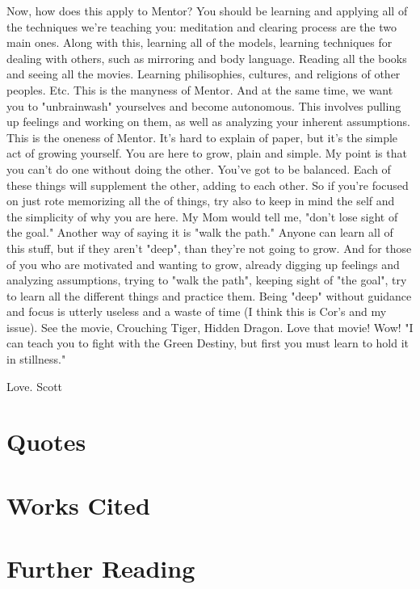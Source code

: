 Now, how does this apply to Mentor? You should be learning and applying all of the techniques we're teaching you: meditation and clearing process are the two main ones. Along with this, learning all of the models, learning techniques for dealing with others, such as mirroring and body language. Reading all the books and seeing all the movies. Learning philisophies, cultures, and religions of other peoples. Etc.
This is the manyness of Mentor.
And at the same time, we want you to "unbrainwash" yourselves and become autonomous. This involves pulling up feelings and working on them, as well as analyzing your inherent assumptions.
This is the oneness of Mentor. It's hard to explain of paper, but it's the simple act of growing yourself. You are here to grow, plain and simple.
My point is that you can't do one without doing the other. You've got to be balanced. Each of these things will supplement the other, adding to each other. So if you're focused on just rote memorizing all the of things, try also to keep in mind the self and the simplicity of why you are here. My Mom would tell me, "don't lose sight of the goal." Another way of saying it is "walk the path." Anyone can learn all of this stuff, but if they aren't "deep", than they're not going to grow.
And for those of you who are motivated and wanting to grow, already digging up feelings and analyzing assumptions, trying to "walk the path", keeping sight of "the goal", try to learn all the different things and practice them. Being "deep" without guidance and focus is utterly useless and a waste of time (I think this is Cor's and my issue). See the movie, Crouching Tiger, Hidden Dragon. Love that movie! Wow! "I can teach you to fight with the Green Destiny, but first you must learn to hold it in stillness."

Love.
Scott


\section{Quotes}

\section{Works Cited}

\section{Further Reading}


